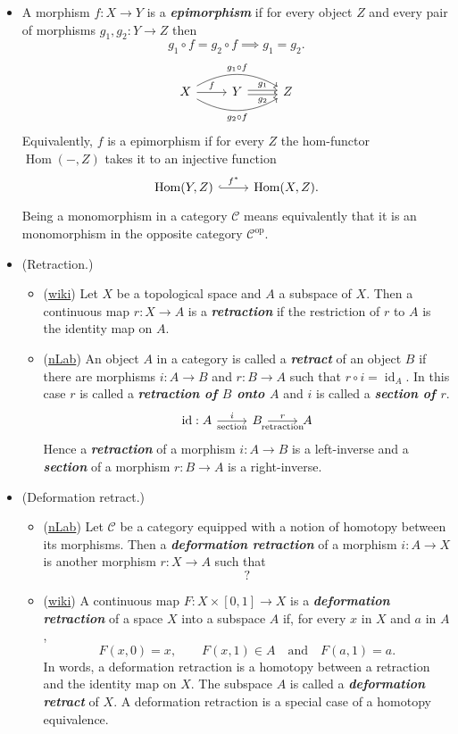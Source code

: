 \documentclass{article}
\newcommand{\Cc}{\mathcal{C}}
\DeclareMathOperator{\id}{id}
\DeclareMathOperator{\Hom}{Hom}
\DeclareMathOperator{\op}{op}
\begin{document}
\begin{defn}
\begin{itemize}
		\item A morphism $f:X\to Y$ is a \textbf{\textit{epimorphism}} if for every object $Z$ and every pair of morphisms $g_1,g_2:Y\to Z$ then
		\[g_1\circ f=g_2\circ f\implies g_1=g_2.\]
		\[\begin{tikzcd}
			X\arrow[r,"f"]\arrow[rr,bend right,swap,"g_2\circ f"]\arrow[rr,bend left,"g_1\circ f"]&Y\arrow[r,shift={(0,.06)},"g_1"]\arrow[r,swap,shift={(0,-.06)},"g_2"]&Z
		\end{tikzcd}\]
		Equivalently, $f$ is a epimorphism if for every $Z$ the hom-functor $\Hom(-,Z)$ takes it to an injective function
		\[\begin{tikzcd}
			\Hom(Y,Z)\arrow[r,hook,"f^*"]&\Hom(X,Z).
		\end{tikzcd}\]
		Being a monomorphism in a category $\Cc$ means equivalently that it is an monomorphism in the opposite category $\Cc^{\op}$.
		
		\item (Retraction.)
		\begin{itemize}
			\item (\href{https://en.wikipedia.org/wiki/Retraction_(topology)}{wiki}) Let $X$ be a topological space and $A$ a subspace of $X$. Then a continuous map $r:X\to A$ is a \textbf{\textit{retraction}} if the restriction of $r$ to $A$ is the identity map on $A$.
			\item (\href{https://ncatlab.org/nlab/show/section}{nLab}) An object $A$ in a category is called a \textbf{\textit{retract}} of an object $B$ if there are morphisms $i:A\to B$ and $r:B\to A$ such that $r\circ i=\id_A$. In this case $r$ is called a \textbf{\textit{retraction of $B$ onto $A$}} and $i$ is called a \textbf{\textit{section of $r$}}.
			\[\begin{tikzcd}
				\id:A\arrow[r,"i","\text{section}"']&B\arrow[r,"r","\text{retraction}"']&A
			\end{tikzcd}\]
			Hence a \textbf{\textit{retraction}} of a morphism $i:A\to B$ is a left-inverse and a \textbf{\textit{section}} of a morphism $r:B\to A$ is a right-inverse.
		\end{itemize}
		\item (Deformation retract.)
		\begin{itemize}
			\item (\href{https://ncatlab.org/nlab/show/deformation+retract}{nLab}) Let $\Cc$ be a category equipped with a notion of homotopy between its morphisms. Then a \textbf{\textit{deformation retraction}} of a morphism $i:A\to X$ is another morphism $r:X\to A$ such that
			\[?\]
			\item (\href{https://en.wikipedia.org/wiki/Retraction_(topology)#Deformation_retract_and_strong_deformation_retract}{wiki}) A continuous map $F:X\times[0,1]\to X$ is a \textbf{\textit{deformation retraction}} of a space $X$ into a subspace $A$ if, for every $x$ in $X$ and $a$ in $A$,
			\[F(x,0)=x,\qquad F(x,1)\in A\quad\text{and}\quad F(a,1)=a.\]
			In words, a deformation retraction is a homotopy between a retraction and the identity map on $X$. The subspace $A$ is called a \textbf{\textit{deformation retract}} of $X$. A deformation retraction is a special case of a homotopy equivalence.
			

\end{itemize}
\end{itemize}
\end{defn}
\end{document}
